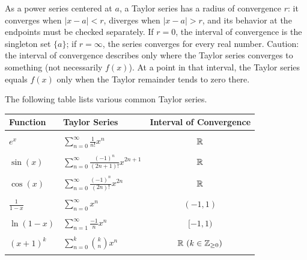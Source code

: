 As a power series centered at $a$, a Taylor series has a radius of convergence $r$: it converges when $|x-a|<r$, diverges when $|x-a|>r$, and its behavior at the endpoints must be checked separately. If $r=0$, the interval of convergence is the singleton set $\{a\}$; if $r=\infty$, the series converges for every real number. Caution: the interval of convergence describes only where the Taylor series converges to something (not necessarily $f(x)$). At a point in that interval, the Taylor series equals $f(x)$ only when the Taylor remainder tends to zero there.

The following table lists various common Taylor series.

\begin{center}
\def\arraystretch{1.2}
\begin{tabular}{@{}llc@{}}
\toprule[0.4mm]
Function & Taylor Series & Interval of Convergence\\
\midrule\\
$e^x$ & $\displaystyle\sum_{n=0}^\infty\frac{1}{n!} x^n$ & $\mathbb{R}$ \\\\
$\sin(x)$ & $\displaystyle\sum_{n=0}^\infty\frac{(-1)^n}{(2n+1)!}x^{2n+1}$ & $\mathbb{R}$ \\\\
$\cos(x)$ & $\displaystyle\sum_{n=0}^\infty\frac{(-1)^n}{(2n)!}x^{2n}$ & $\mathbb{R}$ \\\\
$\frac{1}{1-x}$ & $\displaystyle\sum_{n=0}^\infty x^n$ & $(-1,1)$ \\\\
$\ln(1-x)$ & $\displaystyle\sum_{n=1}^\infty \frac{-1}{n}x^{n}$ & $[-1,1)$ \\\\
$(x+1)^k$ & $\displaystyle\sum_{n=0}^{k}{k\choose n}x^{n}$ & $\R\ (k\in\mathbb{Z}_{\geq 0})$ \\\\
\bottomrule[0.4mm]
\end{tabular}
\end{center}


